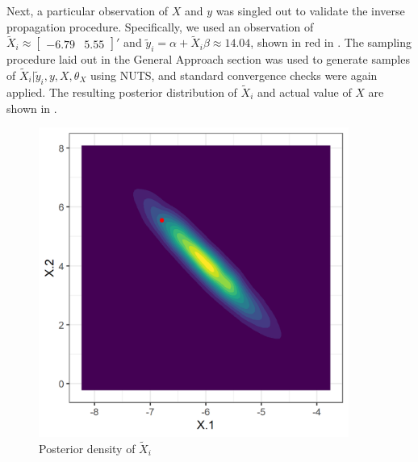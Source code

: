 \documentclass{article}
\newcommand{\ty}{\tilde{y}_i}
\newcommand{\tX}{\tilde{X}_i}
\begin{document}
Next, a particular observation of $X$ and $y$ was singled out to validate the inverse propagation procedure. Specifically, we used an observation of $\tX\approx \begin{bmatrix} -6.79 & 5.55 \end{bmatrix}'$ and $\ty = \alpha + \tX \beta \approx 14.04$, shown in red in . The sampling procedure laid out in the General Approach section was used to generate samples of $\tX | \ty, y, X, \theta_X$ using NUTS, and standard convergence checks were again applied. The resulting posterior distribution of $\tX$ and actual value of $X$ are shown in .
\begin{figure}
	\centering
	\includegraphics[width=4in]{../examples/lm-normal-fixed/images/density-posterior-inverse.png}
	\caption{Posterior density of $\tX$}
	\label{fig:lm-normal-posterior-inverse}
\end{figure}
\end{document}

